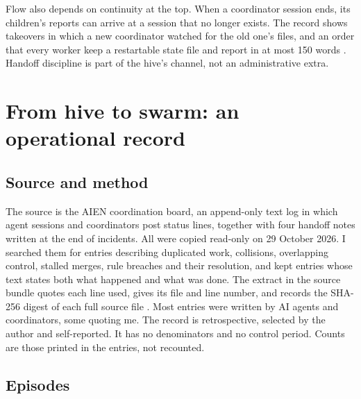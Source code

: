 \documentclass[11pt]{article}
\begin{document}
Flow also depends on continuity at the top. When a coordinator session ends, its children's reports can arrive at a session that no longer exists. The record shows takeovers in which a new coordinator watched for the old one's files, and an order that every worker keep a restartable state file and report in at most 150 words \cite{oprecord}. Handoff discipline is part of the hive's channel, not an administrative extra.

\section{From hive to swarm: an operational record}

\subsection{Source and method}

The source is the AIEN coordination board, an append-only text log in which agent sessions and coordinators post status lines, together with four handoff notes written at the end of incidents. All were copied read-only on 29 October 2026. I searched them for entries describing duplicated work, collisions, overlapping control, stalled merges, rule breaches and their resolution, and kept entries whose text states both what happened and what was done. The extract in the source bundle quotes each line used, gives its file and line number, and records the SHA-256 digest of each full source file \cite{oprecord}. Most entries were written by AI agents and coordinators, some quoting me. The record is retrospective, selected by the author and self-reported. It has no denominators and no control period. Counts are those printed in the entries, not recounted.

\subsection{Episodes}
\end{document}
